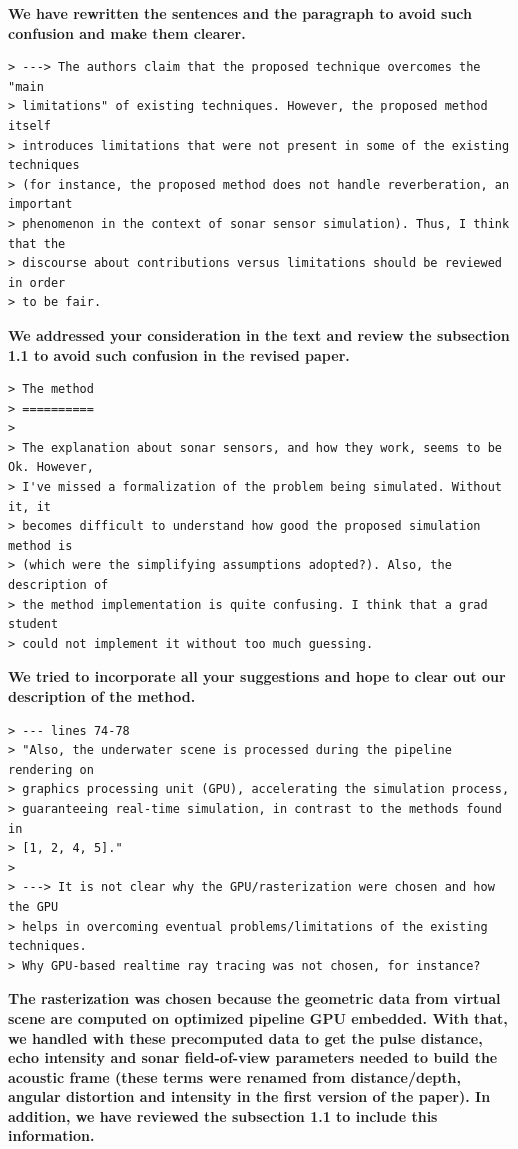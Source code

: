 \documentclass{article}
\begin{document}
\textbf{We have rewritten the sentences and the paragraph to avoid such confusion and make them clearer.}

\begin{verbatim}
> ---> The authors claim that the proposed technique overcomes the "main
> limitations" of existing techniques. However, the proposed method itself
> introduces limitations that were not present in some of the existing techniques
> (for instance, the proposed method does not handle reverberation, an important
> phenomenon in the context of sonar sensor simulation). Thus, I think that the
> discourse about contributions versus limitations should be reviewed in order
> to be fair.
\end{verbatim}

\textbf{We addressed your consideration in the text and review the
subsection 1.1 to avoid such confusion in the revised paper.}

\begin{verbatim}
> The method
> ==========
>
> The explanation about sonar sensors, and how they work, seems to be Ok. However,
> I've missed a formalization of the problem being simulated. Without it, it
> becomes difficult to understand how good the proposed simulation method is
> (which were the simplifying assumptions adopted?). Also, the description of
> the method implementation is quite confusing. I think that a grad student
> could not implement it without too much guessing.
\end{verbatim}

\textbf{We tried to incorporate all your suggestions and hope to clear out our description of the method.}

\begin{verbatim}
> --- lines 74-78
> "Also, the underwater scene is processed during the pipeline rendering on
> graphics processing unit (GPU), accelerating the simulation process,
> guaranteeing real-time simulation, in contrast to the methods found in
> [1, 2, 4, 5]."
>
> ---> It is not clear why the GPU/rasterization were chosen and how the GPU
> helps in overcoming eventual problems/limitations of the existing techniques.
> Why GPU-based realtime ray tracing was not chosen, for instance?
\end{verbatim}

\textbf{The rasterization was chosen because the geometric data from virtual
scene are computed on optimized pipeline GPU embedded. With that, we handled with
these precomputed data to get the pulse distance, echo intensity and sonar field-of-view parameters needed to build the acoustic frame (these terms were renamed from distance/depth, angular distortion and intensity in the first version of the paper). In addition, we have reviewed the subsection 1.1 to include this information.}
\end{document}
